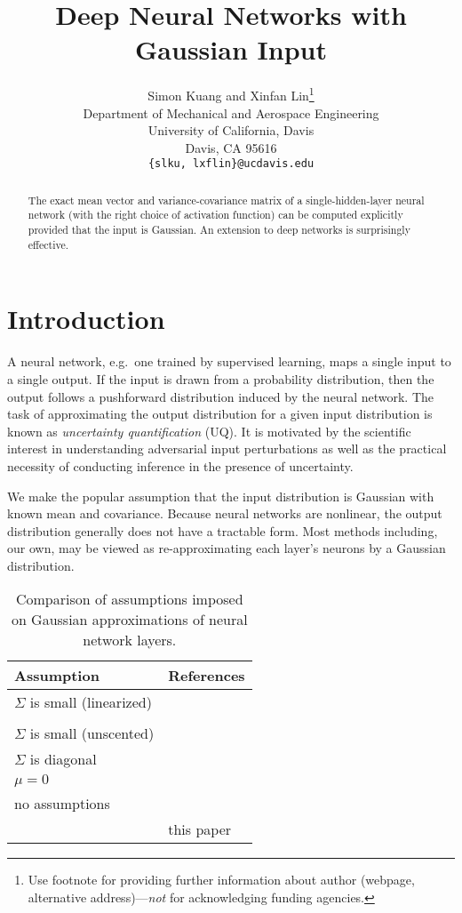 \documentclass{article}
\title{Deep Neural Networks with Gaussian Input}
\author{%
  Simon Kuang and Xinfan Lin\thanks{\color{red} Use footnote for providing further information
    about author (webpage, alternative address)---\emph{not} for acknowledging
    funding agencies.} \\
  Department of Mechanical and Aerospace Engineering\\
  University of California, Davis\\
  Davis, CA 95616 \\
  \texttt{\{slku, lxflin\}@ucdavis.edu} \\
}
\begin{document}
\maketitle


\begin{abstract}
    The exact mean vector and variance-covariance matrix of a single-hidden-layer neural network (with the right choice of activation function) can be computed explicitly provided that the input is Gaussian.
    An extension to deep networks is surprisingly effective.
\end{abstract}


\section{Introduction}
A neural network, e.g.~one trained by supervised learning, maps a single input to a single output.
If the input is drawn from a probability distribution, then the output follows a pushforward distribution induced by the neural network.
The task of approximating the output distribution for a given input distribution is known as \emph{uncertainty quantification} (UQ).
It is motivated by the scientific interest in understanding adversarial input perturbations as well as the practical necessity of conducting inference in the presence of uncertainty.

We make the popular assumption that the input distribution is Gaussian with known mean and covariance.
Because neural networks are nonlinear, the output distribution generally does not have a tractable form.
Most methods including, our own, may be viewed as re-approximating each layer's neurons by a Gaussian distribution.

\begin{table}[h]
    \centering
    \begin{tabular}{ll}
    Assumption & References \\
    \midrule
    \(\Sigma\) is small (linearized)  & \citet{titensky_uncertainty_2018, nagel_kalman-bucy-informed_2022}\\
    & \citet{petersen_uncertainty_2024, jungmann_analytical_2025} \\
    \(\Sigma\) is small (unscented) & \citet{astudillo_propagation_2011, abdelaziz_uncertainty_2015} \\
    \(\Sigma\) is diagonal          &  \citet{huber_bayesian_2020, wagner_kalman_2022,akgul_deterministic_2025}\\
    \(\mu = 0\)    & \citet{bibi_analytic_2018} \\
    no assumptions                 &  \citet{wright_analytic_2024}\\
    & this paper \\
    \end{tabular}
    \caption{\label{tab:covariance-assumptions} Comparison of assumptions imposed on Gaussian approximations of neural network layers.}
\end{table}
\end{document}
